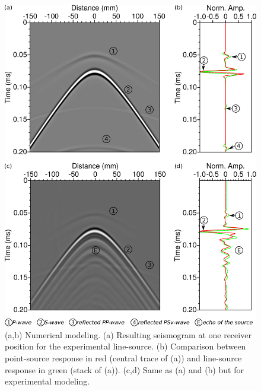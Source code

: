 \documentclass[manuscript,revised]{geophysics}
\begin{document}
\begin{figure}[!h]
	\centering
	\includegraphics[scale=0.5]{fig/amplitude_stack_principle.eps}
	\caption{(a,b) Numerical modeling. (a) Resulting seismogram at one receiver position for the experimental line-source. (b) Comparison between point-source response in red (central trace of (a)) and line-source response in green (stack of (a)). (c,d) Same as (a) and (b) but for experimental modeling.}
	\label{amplitude_stack_principle}
\end{figure}
\end{document}

